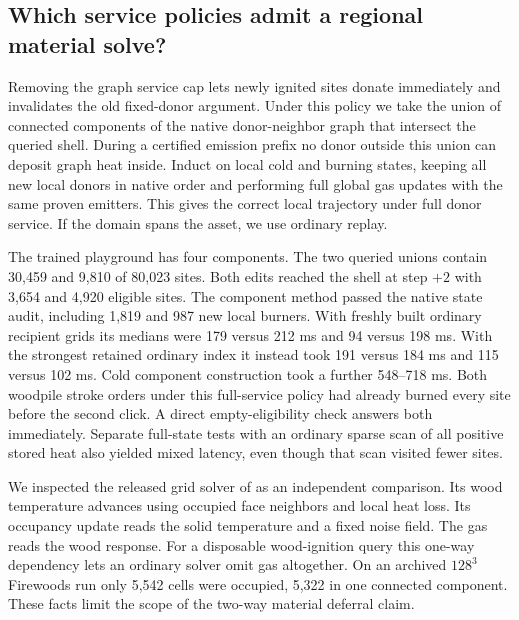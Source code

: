 \subsection{Which service policies admit a regional material solve?}
Removing the graph service cap lets newly ignited sites donate immediately and invalidates the old fixed-donor argument. Under this policy we take the union of connected components of the native donor-neighbor graph that intersect the queried shell. During a certified emission prefix no donor outside this union can deposit graph heat inside. Induct on local cold and burning states, keeping all new local donors in native order and performing full global gas updates with the same proven emitters. This gives the correct local trajectory under full donor service. If the domain spans the asset, we use ordinary replay.

The trained playground has four components. The two queried unions contain 30,459 and 9,810 of 80,023 sites. Both edits reached the shell at step $+2$ with 3,654 and 4,920 eligible sites. The component method passed the native state audit, including 1,819 and 987 new local burners. With freshly built ordinary recipient grids its medians were 179 versus 212 ms and 94 versus 198 ms. With the strongest retained ordinary index it instead took 191 versus 184 ms and 115 versus 102 ms. Cold component construction took a further 548--718 ms. Both woodpile stroke orders under this full-service policy had already burned every site before the second click. A direct empty-eligibility check answers both immediately. Separate full-state tests with an ordinary sparse scan of all positive stored heat also yielded mixed latency, even though that scan visited fewer sites.

We inspected the released grid solver of \citet{shen2026} as an independent comparison. Its wood temperature advances using occupied face neighbors and local heat loss. Its occupancy update reads the solid temperature and a fixed noise field. The gas reads the wood response. For a disposable wood-ignition query this one-way dependency lets an ordinary solver omit gas altogether. On an archived $128^3$ Firewoods run only 5,542 cells were occupied, 5,322 in one connected component. These facts limit the scope of the two-way material deferral claim.

